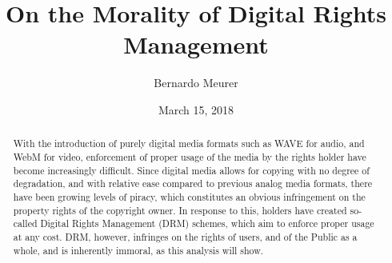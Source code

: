 \documentclass[12pt,letterpaper]{article}
\title{On the Morality of Digital Rights Management}
\author{Bernardo Meurer}
\date{March 15, 2018}
\begin{document}
\maketitle
\begin{abstract}
    With the introduction of purely digital media formats such as WAVE for audio, and WebM for video, enforcement of proper usage of the media by the rights holder have become increasingly difficult.
    Since digital media allows for copying with no degree of degradation, and with relative ease compared to previous analog media formats, there have been growing levels of piracy, which constitutes an obvious infringement on the property rights of the copyright owner.
    In response to this, holders have created so-called Digital Rights Management (DRM) schemes, which aim to enforce proper usage at any cost. DRM, however, infringes on the rights of users, and of the Public as a whole, and is inherently immoral, as this analysis will show.
\end{abstract}
\end{document}
